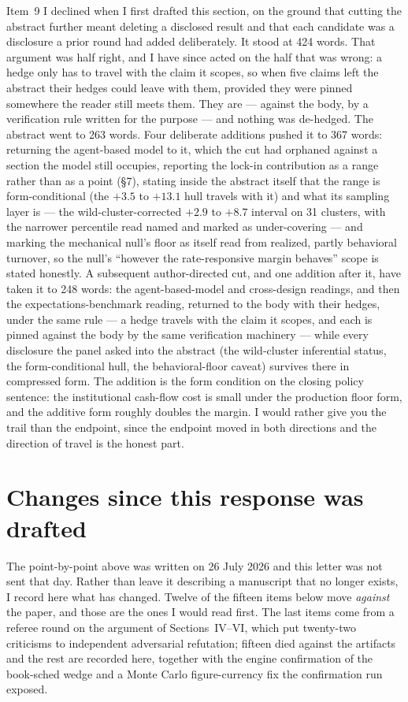 \documentclass[11pt]{article}
\begin{document}
Item~9 I declined when I first drafted this section, on the ground that cutting the
abstract further meant deleting a disclosed result and that each candidate was a
disclosure a prior round had added deliberately. It stood at 424 words. That
argument was half right, and I have since acted on the half that was wrong: a hedge
only has to travel with the claim it scopes, so when five claims left the abstract
their hedges could leave with them, provided they were pinned somewhere the reader
still meets them. They are --- against the body, by a verification rule written for
the purpose --- and nothing was de-hedged. The abstract went to 263 words. Four
deliberate additions pushed it to 367 words: returning the agent-based model to
it, which the cut had orphaned against a section the model still occupies,
reporting the lock-in contribution as a range rather than as a point (\S7),
stating inside the abstract itself that the range is form-conditional (the
$+3.5$ to $+13.1$ hull travels with it) and what its sampling layer is --- the
wild-cluster-corrected $+2.9$ to $+8.7$ interval on 31 clusters, with the
narrower percentile read named and marked as under-covering --- and marking the
mechanical null's floor as itself read from realized, partly behavioral
turnover, so the null's ``however the rate-responsive margin behaves'' scope is stated honestly. A
subsequent author-directed cut, and one addition after it, have taken it to 248 words: the agent-based-model
and cross-design readings, and then the expectations-benchmark reading, returned to
the body with their hedges, under the same rule --- a hedge travels with the claim
it scopes, and each is pinned against the body by the same verification
machinery --- while every disclosure the panel asked into the abstract (the
wild-cluster inferential status, the form-conditional hull, the behavioral-floor
caveat) survives there in compressed form. The addition is the form condition on the closing policy sentence: the institutional cash-flow cost is small under the production floor form, and the additive form roughly doubles the margin. I would
rather give you the trail than the endpoint, since the endpoint moved in both directions
and the direction of travel is the honest part.

\section{Changes since this response was drafted}

The point-by-point above was written on 26 July 2026 and this letter was not sent
that day. Rather than leave it describing a manuscript that no longer exists, I
record here what has changed. Twelve of the fifteen items below move \emph{against} the
paper, and those are the ones I would read first. The last items come from a referee
round on the argument of Sections~IV--VI, which put twenty-two criticisms to
independent adversarial refutation; fifteen died against the artifacts and the rest
are recorded here, together with the engine confirmation of the book-sched wedge
and a Monte Carlo figure-currency fix the confirmation run exposed.
\end{document}
